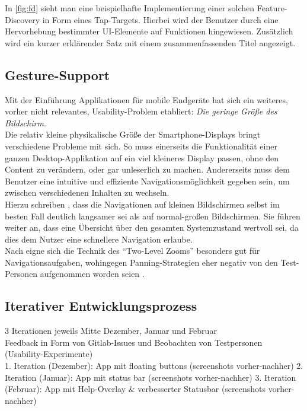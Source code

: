 In \autoref{fig:fd} sieht man eine beispielhafte Implementierung einer solchen Feature-Discovery in Form eines Tap-Targets.
Hierbei wird der Benutzer durch eine Hervorhebung bestimmter UI-Elemente auf Funktionen hingewiesen. 
Zusätzlich wird ein kurzer erklärender Satz mit einem zusammenfassenden Titel angezeigt. \\

\subsection{Gesture-Support}

Mit der Einführung Applikationen für mobile Endgeräte hat sich ein weiteres, vorher nicht relevantes, Usability-Problem etabliert: 
\emph{Die geringe Größe des Bildschirm}. \\

Die relativ kleine physikalische Größe der Smartphone-Displays bringt verschiedene Probleme mit sich. 
So muss einerseits die Funktionalität einer ganzen Desktop-Applikation auf ein viel kleineres Display passen, ohne den Content zu verändern, oder gar unleserlich zu machen.
Andererseits muss dem Benutzer eine intuitive und effiziente Navigationsmöglichkeit gegeben sein, um zwischen verschiedenen Inhalten zu wechseln. \\

Hierzu schreiben \citeauthor{Gutwin04}, dass die Navigationen auf kleinen Bildschirmen selbst im besten Fall deutlich langsamer sei als auf normal-großen Bildschirmen.
Sie führen weiter an, dass eine Übersicht über den gesamten Systemzustand wertvoll sei, da dies dem Nutzer eine schnellere Navigation erlaube. \\
Nach \citeauthor{Gutwin04} eigne sich die Technik des ``Two-Level Zooms'' besonders gut für Navigationsaufgaben, wohingegen Panning-Strategien eher negativ von den Test-Personen aufgenommen worden seien \citep[Seite 8]{Gutwin04}.  


\subsection{Iterativer Entwicklungsprozess}
  3 Iterationen jeweils Mitte Dezember, Januar und Februar \\
  Feedback in Form von Gitlab-Issues und Beobachten von Testpersonen (Usability-Experimente) \\
  1. Iteration (Dezember): App mit floating buttons (screenshots vorher-nachher)
  2. Iteration (Januar): App mit status bar (screenshots vorher-nachher)
  3. Iteration (Februar): App mit Help-Overlay \& verbesserter Statusbar (screenshots vorher-nachher)
